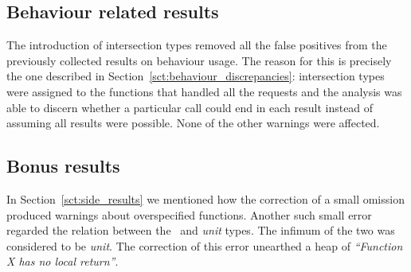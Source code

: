 \subsection{Behaviour related results}

The introduction of intersection types removed all the false positives
from the previously collected results on behaviour usage. The reason
for this is precisely the one described in
Section~\ref{sct:behaviour_discrepancies}: intersection types were
assigned to the functions that handled all the requests and the
analysis was able to discern whether a particular call could end in
each result instead of assuming all results were possible. None of the
other warnings were affected.

\subsection{Bonus results}

In Section~\ref{sct:side_results} we mentioned how the correction of a
small omission produced warnings about overspecified
functions. Another such small error regarded the relation between the
\none\ and \emph{unit} types. The infimum of the two was considered to
be \emph{unit}. The correction of this error unearthed a heap of
\emph{``Function X has no local return''}.
